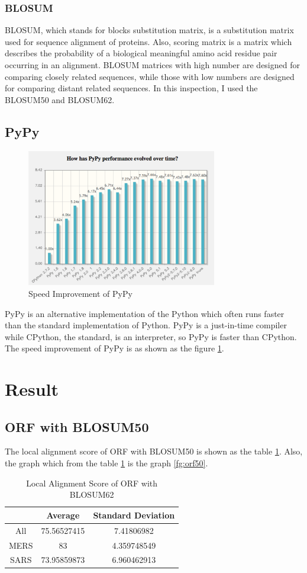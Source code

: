 \documentclass[aps,10pt,a4paper]{article}
\begin{document}
			\subsubsection{BLOSUM}
				BLOSUM, which stands for blocks substitution matrix, is a substitution matrix used for sequence alignment of proteins. Also, scoring matrix is a matrix which describes the probability of a biological meaningful amino acid residue pair occurring in an alignment. BLOSUM matrices with high number are designed for comparing closely related sequences, while those with low numbers are designed for comparing distant related sequences. In this inspection, I used the BLOSUM50 and BLOSUM62. 
		
		\subsection{PyPy}
			\begin{figure}[htbp]
				\centering
				\includegraphics[height=6cm]{pypy}
				\caption{Speed Improvement of PyPy}
				\label{fg:pypy}
			\end{figure}
			PyPy is an alternative implementation of the Python which often runs faster than the standard implementation of Python. PyPy is a just-in-time compiler while CPython, the standard, is an interpreter, so PyPy is faster than CPython. The speed improvement of PyPy is as shown as the figure \ref{fg:pypy}.
	
	\newpage
	\section{Result}
		\subsection{ORF with BLOSUM50}
			The local alignment score of ORF with BLOSUM50 is shown as the table \ref{tb:orf50}. Also, the graph which from the table \ref{tb:orf50} is the graph \ref{fg:orf50}. 
			\begin{table}[h!]
				\centering
				\caption{Local Alignment Score of ORF with BLOSUM62}
				\label{tb:orf50}
				\begin{tabular}{ c || c | c }
					& Average & Standard Deviation \\ \hline
					All & 75.56527415 & 7.41806982 \\
					MERS & 83 & 4.359748549 \\ 
					SARS & 73.95859873 & 6.960462913 \\
				\end{tabular}
			\end{table}
		
\end{document}
